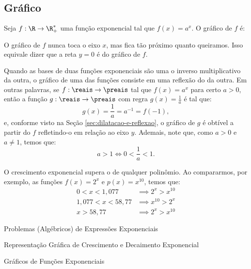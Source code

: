 \subsection{Gráfico}

\begin{example}
    Seja $f: \R \to \R_+^*$ uma função exponencial tal que $f(x) =
a^x$. O gráfico de $f$ é:

O gráfico de $f$ nunca toca o eixo $x$, mas fica tão próximo quanto
queiramos. Isso equivale dizer que a reta $y=0$ é  do
gráfico de $f$.
\end{example}

\begin{remark}
    Quando as bases de duas funções exponenciais são uma o inverso multiplicativo da outra, o gráfico de uma 
    das funções consiste em uma reflexão do da outra. Em outras palavras, se $f:\reais \to \preais$
    tal que $f(x) = a^x $ para certo $a > 0$, então a função $g:\reais \to \preais$ com regra 
    $g(x) = \frac 1 a$ é tal que:
    \[
        g(x) = \frac 1 a = a^{-1} = f(-1),    
    \]
    e, conforme visto na Seção \ref{sec:dilatacao-e-reflexao}, o gráfico de $g$ é obtível a partir do $f$ refletindo-o em relação ao eixo
    $y$. Ademais, note que, como $a > 0$ e $a \ne 1$, temos que:
    $$a > 1 \iff 0 < \frac{1}{a} < 1.$$
\end{remark}

\begin{example}
    O crescimento exponencial supera o de qualquer polinômio. Ao
compararmos, por exemplo, as funções $f(x) = 2^x$ e
$p(x)=x^{10}$, temos que:
%
\begin{align*}
0<x<1{,}077 & \implies  2^x > x^{10}\\
1{,}077 < x < 58{,}77 & \implies  x^{10} > 2^x\\
x>58{,}77 & \implies  2^x > x^{10}
\end{align*}
\end{example}

\begin{onlineact}
    {Problemas (Algébricos) de Expressões Exponenciais}
\end{onlineact}

\begin{onlineact}
    {Representação Gráfica de Crescimento e Decaimento Exponencial}
\end{onlineact}

\begin{onlineact}
    {Gráficos de Funções Exponenciais}
\end{onlineact}